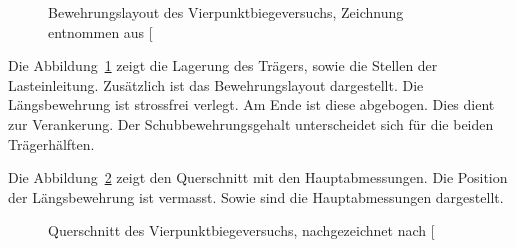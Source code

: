 \documentclass[
  11pt,
  letterpaper,
]{scrreprt}
\begin{document}
\begin{figure}[H]


\caption{\label{fig-versuchsskizze-SV14}Bewehrungslayout des
Vierpunktbiegeversuchs, Zeichnung entnommen aus
{[}\citeproc{ref-gitz_ansatze_2024}{1}{]}}

\end{figure}%

Die Abbildung~\ref{fig-versuchsskizze-SV14} zeigt die Lagerung des
Trägers, sowie die Stellen der Lasteinleitung. Zusätzlich ist das
Bewehrungslayout dargestellt. Die Längsbewehrung ist strossfrei verlegt.
Am Ende ist diese abgebogen. Dies dient zur Verankerung. Der
Schubbewehrungsgehalt unterscheidet sich für die beiden Trägerhälften.

Die Abbildung~\ref{fig-QS-SV14} zeigt den Querschnitt mit den
Hauptabmessungen. Die Position der Längsbewehrung ist vermasst. Sowie
sind die Hauptabmessungen dargestellt.

\begin{figure}[H]


\caption{\label{fig-QS-SV14}Querschnitt des Vierpunktbiegeversuchs,
nachgezeichnet nach {[}\citeproc{ref-gitz_ansatze_2024}{1}{]}}

\end{figure}%
\end{document}
